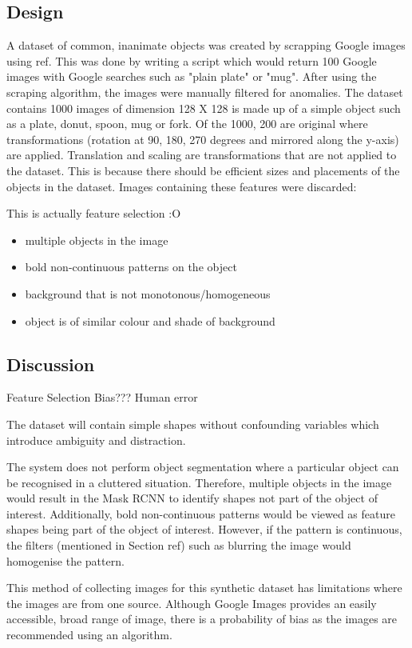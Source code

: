 \subsection{Design}
A dataset of common, inanimate objects was created by scrapping Google images using ref. This was done by writing a script which would return 100 Google images with Google searches such as "plain plate" or "mug". After using the scraping algorithm, the images were manually filtered for anomalies. The dataset contains 1000 images of dimension  128 X 128 is made up of a simple object such as a plate, donut, spoon, mug or fork. Of the 1000, 200 are original where transformations (rotation at 90, 180, 270 degrees and mirrored along the y-axis) are applied. Translation and scaling are transformations that are not applied to the dataset. This is because there should be efficient sizes and placements of the objects in the dataset. Images containing these features were discarded:

This is actually feature selection :O
\begin{itemize}
\item multiple objects in the image
\item bold non-continuous patterns on the object
\item background that is not monotonous/homogeneous
\item object is of similar colour and shade of background
\end{itemize}

\subsection{Discussion}
Feature Selection Bias??? Human error

The dataset will contain simple shapes without confounding variables which introduce ambiguity and distraction. 

The system does not perform object segmentation where a particular object can be recognised in a cluttered situation. Therefore, multiple objects in the image would result in the Mask RCNN to identify shapes not part of the object of interest. Additionally, bold non-continuous patterns would be viewed as feature shapes being part of the object of interest. However, if the pattern is continuous, the filters (mentioned in Section ref) such as blurring the image would homogenise the pattern. 

This method of collecting images for this synthetic dataset has limitations where the images are from one source. Although Google Images provides an easily accessible, broad range of image, there is a probability of bias as the images are recommended using an algorithm. 

